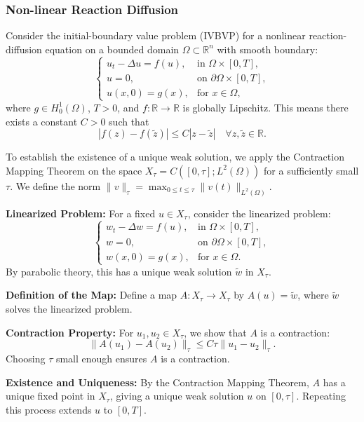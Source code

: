 \documentclass[12pt, reqno]{amsart}
\theoremstyle{definition}
\numberwithin{equation}{section}
\begin{document}
\subsubsection{Non-linear Reaction Diffusion}
Consider the initial-boundary value problem (IVBVP) for a nonlinear reaction-diffusion equation on a bounded domain \( \Omega \subset \mathbb{R}^n \) with smooth boundary:
\[
\begin{cases}
u_t - \Delta u = f(u), & \text{in } \Omega \times [0, T], \\
u = 0, & \text{on } \partial \Omega \times [0, T], \\
u(x, 0) = g(x), & \text{for } x \in \Omega,
\end{cases}
\]
where \( g \in H_0^1(\Omega) \), \( T > 0 \), and \( f: \mathbb{R} \to \mathbb{R} \) is globally Lipschitz. This means there exists a constant \( C > 0 \) such that
\[
|f(z) - f(\tilde{z})| \leq C |z - \tilde{z}| \quad \forall z, \tilde{z} \in \mathbb{R}.
\]

To establish the existence of a unique weak solution, we apply the Contraction Mapping Theorem on the space \( X_\tau = C([0, \tau]; L^2(\Omega)) \) for a sufficiently small \( \tau \). We define the norm \( \|v\|_\tau = \max_{0 \leq t \leq \tau} \|v(t)\|_{L^2(\Omega)} \).

\textbf{Linearized Problem:} For a fixed \( u \in X_\tau \), consider the linearized problem:
   \[
   \begin{cases}
   w_t - \Delta w = f(u), & \text{in } \Omega \times [0, T], \\
   w = 0, & \text{on } \partial \Omega \times [0, T], \\
   w(x, 0) = g(x), & \text{for } x \in \Omega.
   \end{cases}
   \]
   By parabolic theory, this has a unique weak solution \( \tilde{w} \) in \( X_\tau \).

\textbf{Definition of the Map:} Define a map \( A: X_\tau \to X_\tau \) by \( A(u) = \tilde{w} \), where \( \tilde{w} \) solves the linearized problem.

\textbf{Contraction Property:} For \( u_1, u_2 \in X_\tau \), we show that \( A \) is a contraction:
   \[
   \|A(u_1) - A(u_2)\|_\tau \leq C \tau \|u_1 - u_2\|_\tau.
   \]
   Choosing \( \tau \) small enough ensures \( A \) is a contraction.

\textbf{Existence and Uniqueness:} By the Contraction Mapping Theorem, \( A \) has a unique fixed point in \( X_\tau \), giving a unique weak solution \( u \) on \( [0, \tau] \). Repeating this process extends \( u \) to \( [0, T] \).
\end{document}
